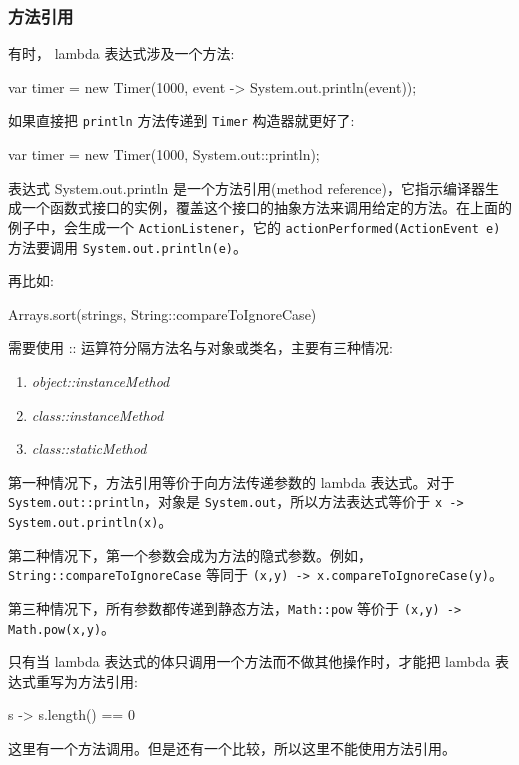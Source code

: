 \subsubsection{方法引用}

有时， lambda 表达式涉及一个方法:
\begin{Java}
var timer = new Timer(1000, event -> System.out.println(event));
\end{Java}

如果直接把 \texttt{println} 方法传递到 \texttt{Timer} 构造器就更好了:
\begin{Java}
var timer = new Timer(1000, System.out::println);    
\end{Java}

表达式 System.out.println 是一个方法引用(method reference)，它指示编译器生成一个函数式接口的实例，覆盖这个接口的抽象方法来调用给定的方法。在上面的例子中，会生成一个 \texttt{ActionListener}，它的 \texttt{actionPerformed(ActionEvent e)} 方法要调用 \texttt{System.out.println(e)}。

再比如:
\begin{Java}
Arrays.sort(strings, String::compareToIgnoreCase)
\end{Java}

需要使用 :: 运算符分隔方法名与对象或类名，主要有三种情况:
\begin{enumerate}
    \item \textit{object::instanceMethod}
    \item \textit{class::instanceMethod}
    \item \textit{class::staticMethod}
\end{enumerate}

第一种情况下，方法引用等价于向方法传递参数的 lambda 表达式。对于\texttt{System.out::println}，对象是 \texttt{System.out}，所以方法表达式等价于 \texttt{x -> System.out.println(x)}。

第二种情况下，第一个参数会成为方法的隐式参数。例如，\texttt{String::compareToIgnoreCase} 等同于 \texttt{(x,y) -> x.compareToIgnoreCase(y)}。

第三种情况下，所有参数都传递到静态方法，\texttt{Math::pow} 等价于 \texttt{(x,y) -> Math.pow(x,y)}。

只有当 lambda 表达式的体只调用一个方法而不做其他操作时，才能把 lambda 表达式重写为方法引用:
\begin{Java}
s -> s.length() == 0
\end{Java}

这里有一个方法调用。但是还有一个比较，所以这里不能使用方法引用。

